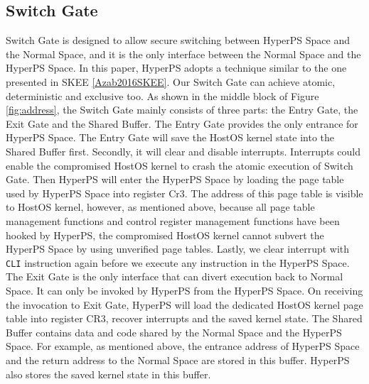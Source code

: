 \subsection{Switch Gate}
Switch Gate is designed to allow secure switching between HyperPS Space and the Normal Space, and it is the only interface between the Normal Space and the HyperPS Space. In this paper, HyperPS adopts a technique similar to the one presented in SKEE \ref{Azab2016SKEE}. Our Switch Gate can achieve atomic, deterministic and exclusive too.
As shown in the middle block of Figure \ref{fig:address}, the Switch Gate mainly consists of three parts: the Entry Gate, the Exit Gate and the Shared Buffer. 
The Entry Gate provides the only entrance for HyperPS Space. The Entry Gate will save the HostOS kernel state into the Shared Buffer first. Secondly, it will clear and disable interrupts. Interrupts could enable the compromised HostOS kernel to crash the atomic execution of Switch Gate. 
Then HyperPS will enter the HyperPS Space by loading the page table used by HyperPS Space into register Cr3. 
The address of this page table is visible to HostOS kernel, however, as mentioned above, because all page table management functions and control register management functions have been hooked by HyperPS, the compromised HostOS kernel cannot subvert the HyperPS Space by using unverified page tables. 
Lastly, we clear interrupt with \verb|CLI| instruction again before we execute any instruction in the HyperPS Space. 
The Exit Gate is the only interface that can divert execution back to Normal Space. It can only be invoked by HyperPS from the HyperPS Space. 
On receiving the invocation to Exit Gate, 
HyperPS will load the dedicated HostOS kernel page table into register CR3, recover interrupts and the saved kernel state. 
The Shared Buffer contains data and code shared by the Normal Space and the HyperPS Space. For example, as mentioned above, the entrance address of HyperPS Space and the return address to the Normal Space are stored in this buffer. HyperPS also stores the saved kernel state in this buffer. 

